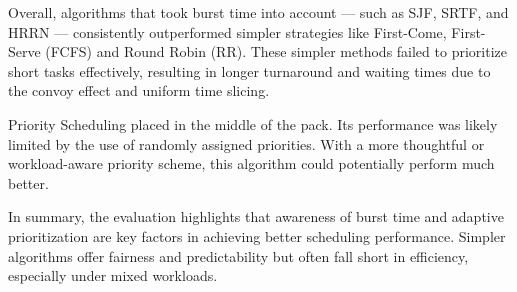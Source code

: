 \documentclass[conference]{report}
\begin{document}
Overall, algorithms that took burst time into account — such as SJF, SRTF, and HRRN — consistently outperformed simpler strategies like First-Come, First-Serve (FCFS) and Round Robin (RR). These simpler methods failed to prioritize short tasks effectively, resulting in longer turnaround and waiting times due to the convoy effect and uniform time slicing.

Priority Scheduling placed in the middle of the pack. Its performance was likely limited by the use of randomly assigned priorities. With a more thoughtful or workload-aware priority scheme, this algorithm could potentially perform much better.

In summary, the evaluation highlights that awareness of burst time and adaptive prioritization are key factors in achieving better scheduling performance. Simpler algorithms offer fairness and predictability but often fall short in efficiency, especially under mixed workloads.

\end{document}

